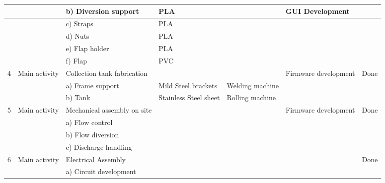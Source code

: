 \begin{landscape}
\begin{table}[H]
{\begin{tabular}{|l|l|l|l|l|l|l|}
   &               & b) Diversion support                & PLA                   &                    & GUI Development       &         \\ \hline
   &               & c) Straps                           & PLA                   &                    &                       &         \\ \hline
   &               & d) Nuts                             & PLA                   &                    &                       &         \\ \hline
   &               & e) Flap holder                      & PLA                   &                    &                       &         \\ \hline
   &               & f) Flap                             & PVC                   &                    &                       &         \\ \hline
4  & Main activity & Collection tank fabrication         &                       &                    & Firmware development  & Done    \\ \hline
   &               & a) Frame support                    & Mild Steel brackets   & Welding machine    &                       &         \\ \hline
   &               & b) Tank                             & Stainless Steel sheet & Rolling machine    &                       &         \\ \hline
5  & Main activity & Mechanical assembly on site         &                       &                    & Firmware development  & Done    \\ \hline
   &               & a) Flow control                     &                       &                    &                       &         \\ \hline
   &               & b) Flow diversion                   &                       &                    &                       &         \\ \hline
   &               & c) Discharge handling               &                       &                    &                       &         \\ \hline
6  & Main activity & Electrical Assembly                 &                       &                    &                       & Done    \\ \hline
   &               & a) Circuit development              &                       &                    &                       &         \\ \hline

\end{tabular}}
\end{table}
\end{landscape}
